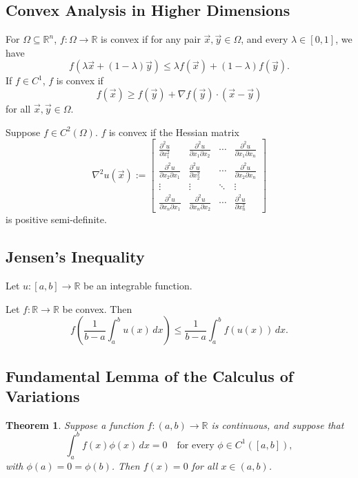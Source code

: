 \documentclass[12pt]{report}
\newtheorem{theorem}{Theorem}[section]
\begin{document}
\subsection{Convex Analysis in Higher Dimensions}
\hspace*{1.5em}For \(\Omega \subseteq \mathbb{R}^n\), \(f: \Omega \to \mathbb{R}\) is convex if for any pair \(\vec{x}, \vec{y} \in \Omega\), and every \(\lambda \in [0, 1]\), we have \[f(\lambda \vec{x} + (1-\lambda)\vec{y}) \leq \lambda f(\vec{x}) + (1-\lambda) f(\vec{y}). \] 
If \(f \in C^1\), $f$ is convex if 
\[
f(\vec{x}) \geq f(\vec{y}) + \nabla f(\vec{y}) \cdot (\vec{x} - \vec{y})
\]
for all $\vec{x}, \vec{y} \in \Omega$. 

Suppose $f \in C^2(\Omega)$. $f$ is convex if the Hessian matrix
\[
\nabla^2 u(\vec{x}) := 
\begin{bmatrix}
\frac{\partial^2 u}{\partial x_1^2} & \frac{\partial^2 u}{\partial x_1 \partial x_2} & \cdots & \frac{\partial^2 u}{\partial x_1 \partial x_n} \\
\frac{\partial^2 u}{\partial x_2 \partial x_1} & \frac{\partial^2 u}{\partial x_2^2} & \cdots & \frac{\partial^2 u}{\partial x_2 \partial x_n} \\
\vdots & \vdots & \ddots & \vdots \\
\frac{\partial^2 u}{\partial x_n \partial x_1} & \frac{\partial^2 u}{\partial x_n \partial x_2} & \cdots & \frac{\partial^2 u}{\partial x_n^2}
\end{bmatrix}
\]
is positive semi-definite.

\subsection{Jensen's Inequality}
Let $u : [a, b] \to \mathbb{R}$ be an integrable function.  

Let $f : \mathbb{R} \to \mathbb{R}$ be convex. Then
\[
f\left( \frac{1}{b-a} \int_a^b u(x) \, dx \right) 
\leq 
\frac{1}{b-a} \int_a^b f(u(x)) \, dx.
\]

\subsection{Fundamental Lemma of the Calculus of Variations}
\begin{theorem}
Suppose a function $f : (a, b) \to \mathbb{R}$ is continuous, and suppose that 
\[
\int_a^b f(x) \phi(x) \, dx = 0 \quad \text{for every } \phi \in C^1([a, b]),
\]
with $\phi(a) = 0 = \phi(b)$.  Then $f(x) = 0$ for all $x \in (a, b)$.
\end{theorem}
\end{document}
